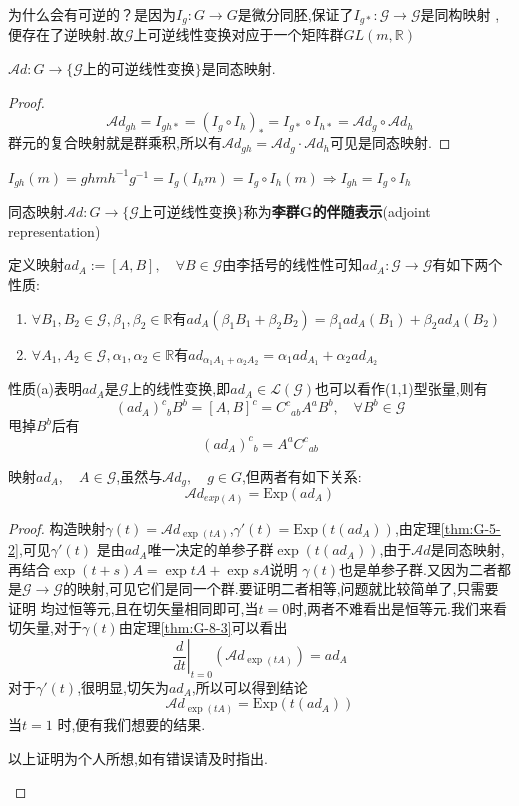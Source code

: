 \documentclass[../main.tex]{subfiles}
\begin{document}
为什么会有可逆的？是因为$I_g:G\rightarrow G$是微分同胚,保证了$I_{g*}:\mathscr{G}\rightarrow \mathscr{G}$是同构映射
,便存在了逆映射.故{$\mathscr{G}$上可逆线性变换}对应于一个矩阵群$GL(m,\mathbb{R})$
\begin{theorem}
	$\mathscr{A}\!d:G \rightarrow \{\mathscr{G}\text{上的可逆线性变换}\}$是同态映射.
\end{theorem}
\begin{proof}
	$$\mathscr{A}\!d_{gh} = I_{gh*} =(I_{g}\circ I_{h})_* =I_{g*} \circ I_{h*}= \mathscr{A}\!d_g \circ \mathscr{A}\!d_h$$
	群元的复合映射就是群乘积,所以有$\mathscr{A}\!d_{gh} = \mathscr{A}\!d_g\cdot \mathscr{A}\!d_h$可见是同态映射.
\end{proof}
\begin{note}
	$I_{gh}(m) =ghmh^{-1}g^{-1} = I_{g}(I_h{m}) = I_{g}\circ I_{h} (m) \Rightarrow I_{gh} = I_g\circ I_h$
\end{note}
\begin{definition}
	同态映射$\mathscr{A}\!d:G \rightarrow \{\mathscr{G}\text{上可逆线性变换}\}$称为\textbf{李群G的伴随表示}(adjoint representation)
\end{definition}

定义映射$ad_A:=[A,B],\quad \forall B \in \mathscr{G}$由李括号的线性性可知$ad_A:\mathscr{G}\rightarrow \mathscr{G}$有如下两个性质:
\begin{enumerate}[label = (\alph*).]
	\item $\forall B_1,B_2\in \mathscr{G},\beta_1,\beta_2 \in \mathbb{R}$有$ad_A(\beta_1 B_1 +\beta_2B_2) = \beta_1 ad_A(B_1) + \beta_2 ad_A(B_2)$
	\item $\forall A_1,A_2\in \mathscr{G},\alpha_1,\alpha_2 \in \mathbb{R}$有$ad_{\alpha_1A_1 + \alpha_2 A_2}=\alpha_1 ad_{A_1} + \alpha_2 ad_{A_2}$
\end{enumerate}
性质(a)表明$ad_A$是$\mathscr{G}$上的线性变换,即$ad_A \in \mathscr{L}(\mathscr{G})$也可以看作(1,1)型张量,则有
$$
	(ad_A)^c{}_bB^b = [A,B]^c = C^c{}_{ab}A^aB^b,\quad \forall B^b \in \mathscr{G}$$
甩掉$B^b$后有$$
	(ad_A)^c{}_b = A^aC^c{}_{ab}
$$

映射$ad_A,\quad A \in \mathscr{G}$,虽然与$\mathscr{A}\!d_g,\quad g\in G$,但两者有如下关系:$$
	\mathscr{A}\!d_{exp(A)} = \text{Exp}(ad_A)$$
\begin{proof}
	构造映射$\gamma(t) = \mathscr{A}\!d_{\exp(tA)}$,$\gamma'(t) = \text{Exp}(t (ad_A))$,由定理\ref{thm:G-5-2},可见$\gamma'(t)$
	是由$ad_A$唯一决定的单参子群$\exp(t (ad_A))$,由于$\mathscr{A}\!d$是同态映射,再结合$\exp(t+s) A = \exp tA + \exp sA$说明
	$\gamma(t)$也是单参子群.又因为二者都是$\mathscr{G}\rightarrow \mathscr{G}$的映射,可见它们是同一个群.要证明二者相等,问题就比较简单了,只需要证明
	均过恒等元,且在切矢量相同即可,当$t = 0$时,两者不难看出是恒等元.我们来看切矢量,对于$\gamma(t)$由定理\ref{thm:G-8-3}可以看出$$
		\left.\frac{d}{dt}\right|_{t=0} (\mathscr{A}\!d_{\exp(tA)}) = ad_A $$
	对于$\gamma'(t)$,很明显,切矢为$ad_A$,所以可以得到结论$$
		\mathscr{A}\!d_{\exp(tA)} = \text{Exp}(t (ad_A))$$当$t = 1$
	时,便有我们想要的结果.

	\begin{note}以上证明为个人所想,如有错误请及时指出.\end{note}
\end{proof}
\end{document}
